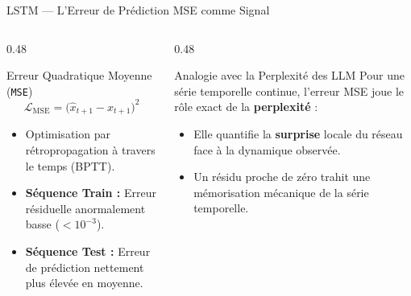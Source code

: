 \documentclass[aspectratio=169, 10pt, table]{beamer}
\begin{document}
\begin{frame}{LSTM --- L'Erreur de Prédiction MSE comme Signal}
    \begin{columns}[T]
        \begin{column}{0.48\textwidth}
            \begin{block}{Erreur Quadratique Moyenne (\texttt{MSE})}
                \small
                $$\mathcal{L}_{\text{MSE}} = \big(\hat{x}_{t+1} - x_{t+1}\big)^2$$
                \vspace{-0.2cm}
                \begin{itemize}
                    \item Optimisation par rétropropagation à travers le temps (BPTT).
                    \item \textbf{Séquence Train :} Erreur résiduelle anormalement basse ($< 10^{-3}$).
                    \item \textbf{Séquence Test :} Erreur de prédiction nettement plus élevée en moyenne.
                \end{itemize}
            \end{block}
        \end{column}

        \begin{column}{0.48\textwidth}
            \begin{block}{Analogie avec la Perplexité des LLM}
                \small
                Pour une série temporelle continue, l'erreur MSE joue le rôle exact de la \textbf{perplexité} :
                \begin{itemize}
                    \item Elle quantifie la \textbf{surprise} locale du réseau face à la dynamique observée.
                    \item Un résidu proche de zéro trahit une mémorisation mécanique de la série temporelle.
                \end{itemize}
            \end{block}
        \end{column}
    \end{columns}
\end{frame}
\end{document}
